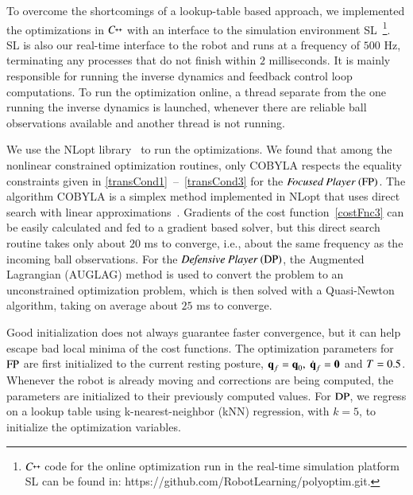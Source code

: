 To overcome the shortcomings of a lookup-table based approach, we implemented the optimizations in $\CC$ with an interface to the simulation environment SL~\citep{Schaal06}\footnote{$\CC$ code for the online optimization run in the real-time simulation platform SL can be found in: https://github.com/RobotLearning/polyoptim.git.}. SL is also our real-time interface to the robot and runs at a frequency of $500$ Hz, terminating any processes that do not finish within $2$ milliseconds. It is mainly responsible for running the inverse dynamics and feedback control loop computations. To run the optimization online, a thread separate from the one running the inverse dynamics is launched, whenever there are reliable ball observations available and another thread is not running.

We use the NLopt library~\citep{NLopt} to run the optimizations. We found that among the nonlinear constrained optimization routines, only COBYLA respects the equality constraints given in \mbox{\eqref{transCond1} -- \eqref{transCond3}} for the $\emph{Focused Player} \ (\mathrm{FP})$. The algorithm COBYLA is a simplex method implemented in NLopt that uses direct search with linear approximations~\citep{Powell94}. Gradients of the cost function~\eqref{costFnc3} can be easily calculated and fed to a gradient based solver, but this direct search routine takes only about $20$ ms to converge, i.e., about the same frequency as the incoming ball observations. For the $\AlgTwo \ (\algTwo)$, the Augmented Lagrangian (AUGLAG) method is used to convert the problem to an unconstrained optimization problem, which is then solved with a Quasi-Newton algorithm, taking on average about $25$ ms to converge. 

Good initialization does not always guarantee faster convergence, but it can help escape bad local minima of the cost functions. The optimization parameters for $\mathrm{FP}$ are first initialized to the current resting posture, $\boldsymbol{\mathrm{q}}_f = \boldsymbol{\mathrm{q}}_0, \ \dot{\boldsymbol{\mathrm{q}}}_f = \boldsymbol{\mathrm{0}}$ and $T = 0.5$. Whenever the robot is already moving and corrections are being computed, the parameters are initialized to their previously computed values. For $\mathrm{DP}$, we regress on a lookup table using k-nearest-neighbor (kNN) regression, with $k = 5$, to initialize the optimization variables.

